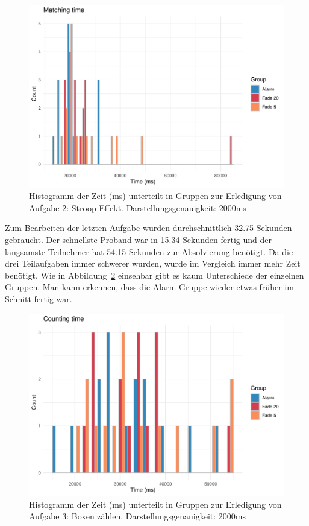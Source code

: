 \begin{figure}[H]
	\centering
	\includegraphics[width=\textwidth]{./_StudyResults/matchingTimeHist}
	\caption{Histogramm der Zeit (ms) unterteilt in Gruppen zur Erledigung von Aufgabe 2: Stroop-Effekt. Darstellungsgenauigkeit: 2000ms}
	\label{fig:matchingTimeHistogram}
\end{figure}

Zum Bearbeiten der letzten Aufgabe wurden durchschnittlich 32.75 Sekunden gebraucht. Der schnellste Proband war in 15.34 Sekunden fertig und der langsamste Teilnehmer hat 54.15 Sekunden zur Absolvierung benötigt. Da die drei Teilaufgaben immer schwerer wurden, wurde im Vergleich immer mehr Zeit benötigt.
Wie in Abbildung~\ref{fig:countingTimeHistogram} einsehbar gibt es kaum Unterschiede der einzelnen Gruppen. Man kann erkennen, dass die Alarm Gruppe wieder etwas früher im Schnitt fertig war. 

\begin{figure}[H]
	\centering
	\includegraphics[width=\textwidth]{./_StudyResults/countingTimeHist}
	\caption{Histogramm der Zeit (ms) unterteilt in Gruppen zur Erledigung von Aufgabe 3: Boxen zählen. Darstellungsgenauigkeit: 2000ms}
	\label{fig:countingTimeHistogram}
\end{figure}

